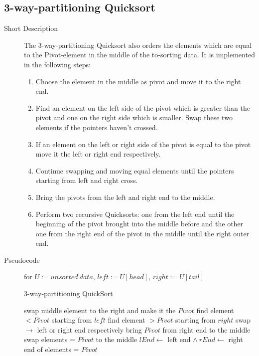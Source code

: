 \documentclass[11pt]{amsart}
\begin{document}
\subsection{3-way-partitioning Quicksort}
\begin{description}
	\item[Short Description] The 3-way-partitioning Quicksort also orders the elements which are equal to the Pivot-element in the middle of the to-sorting data.
It is implemented in the following steps:
		\begin{enumerate}
			\item Choose the element in the middle as pivot and move it to the right end.
			\item Find an element on the left side of the pivot which is greater than the pivot and one on the right side which is smaller. Swap these two elements if the pointers haven't crossed.
			\item If an element on the left or right side of the pivot is equal to the pivot move it the left or right end respectively. 
			\item Continue swapping and moving equal elements until the pointers starting from left and right cross.
			\item Bring the pivots from the left and right end to the middle.
			\item Perform two recursive Quicksorts: one from the left end until the beginning of the pivot brought into the middle before and the other one from the right end of the pivot in the middle until the right outer end.
		\end{enumerate}
	\newpage
	\item[Pseudocode] for $U := unsorted~data$, $left := U[head]$, $right := U[tail]$
	\begin{algorithm}
	\caption{3-way-partitioning QuickSort}
		\begin{algorithmic}[1]
			\State swap middle element to the right and make it the $Pivot$
			 \State \Return \EndIf
			\Repeat
				\State find element $< Pivot$ starting from $left$
				\State find element $> Pivot$ starting from $right$
					\State swap $\to$ left or right end respectively
				\EndIf
			\State bring $Pivot$ from right end to the middle
			\State swap elements = $Pivot$ to the middle
			\Statex
			\State $lEnd \gets$ left end $\land~rEnd \gets$ right end of elements = $Pivot$ 
			\Statex

\end{algorithmic}
\end{algorithm}
\end{description}
\end{document}
